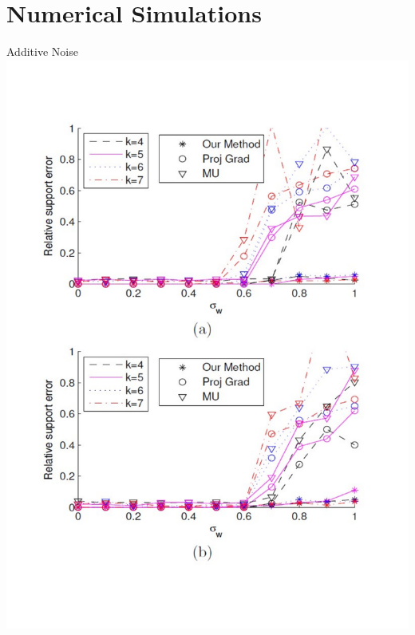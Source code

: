 \documentclass[unknownkeysallowed]{beamer}
\begin{document}
\section{Numerical Simulations}
\begin{frame}{Additive Noise}
	\centering
	\includegraphics[scale=0.32]{relative_support_error.pdf}
\end{frame}
\end{document}

